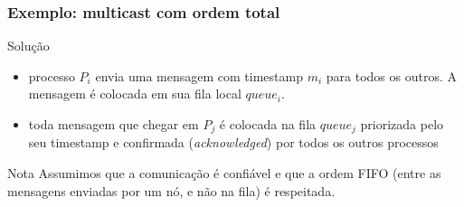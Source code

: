 \documentclass[Ligatures=TeX,table,brazil,svgnames,usetotalslideindicator,compress,10pt]{beamer}
\begin{document}
\begin{frame}
  \frametitle{Exemplo: multicast com ordem total}

  \begin{block}{Solução}

    \begin{itemize}
    \item processo $P_i$ envia uma \alert{mensagem com timestamp} $m_i$ para todos os outros. A mensagem é colocada em sua fila local $queue_i$.
    \item toda mensagem que chegar em $P_j$ é colocada na fila $queue_j$ \alert{priorizada pelo seu timestamp} e \alert{confirmada} (\textit{acknowledged}) por todos os outros processos
    \end{itemize}
  \end{block}


\begin{alertblock}{Nota}
  Assumimos que a comunicação é \alert{confiável} e que a \alert{ordem FIFO} (entre as mensagens enviadas por um nó, e não na fila)  é respeitada.
\end{alertblock}

\end{frame}
\end{document}
